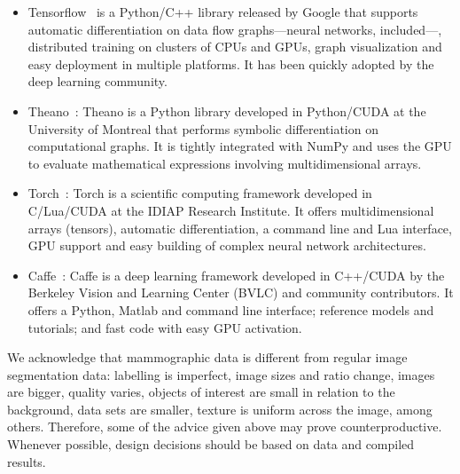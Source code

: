 \begin{itemize}
	\item Tensorflow~\cite{Abadi2015} is a Python/C++ library released by Google that supports automatic differentiation on data flow graphs---neural networks, included---, distributed training on clusters of CPUs and GPUs, graph visualization and easy deployment in multiple platforms. It has been quickly adopted by the deep learning community.
	\item Theano~\cite{Bergstra2010, Bastien2012}: Theano is a Python library developed in Python/CUDA at the University of Montreal that performs symbolic differentiation on computational graphs. It is tightly integrated with NumPy and uses the GPU to evaluate mathematical expressions involving multidimensional arrays.
	\item Torch~\cite{Collobert2011}: Torch is a scientific computing framework developed in C/Lua/CUDA at the IDIAP Research Institute. It offers multidimensional arrays (tensors), automatic differentiation, a command line and Lua interface, GPU support and easy building of complex neural network architectures.
	\item Caffe~\cite{Jia2014}: Caffe is a deep learning framework developed in C++/CUDA by the Berkeley Vision and Learning Center (BVLC) and community contributors. It offers a Python, Matlab and command line interface; reference models and tutorials; and fast code with easy GPU activation.
\end{itemize}

\bigskip

We acknowledge that mammographic data is different from regular image segmentation data: labelling is imperfect, image sizes and ratio change, images are bigger, quality varies, objects of interest are small in relation to the background, data sets are smaller, texture is uniform across the image, among others. Therefore, some of the advice given above may prove counterproductive. Whenever possible, design decisions should be based on data and compiled results.
